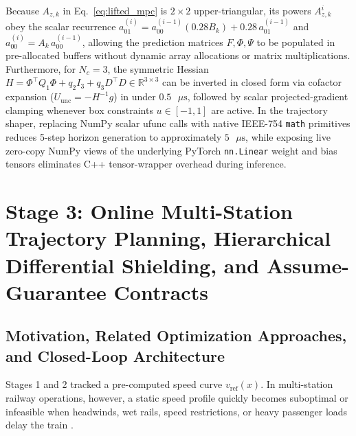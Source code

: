 \documentclass[10pt,a4paper]{article}
\begin{document}
Because $A_{z,k}$ in Eq.~\ref{eq:lifted_mpc} is $2\times 2$ upper-triangular, its powers $A_{z,k}^i$ obey the scalar recurrence $a_{01}^{(i)} = a_{00}^{(i-1)}(0.28 B_k) + 0.28\,a_{01}^{(i-1)}$ and $a_{00}^{(i)} = A_k\,a_{00}^{(i-1)}$, allowing the prediction matrices $F, \Phi, \Psi$ to be populated in pre-allocated buffers without dynamic array allocations or matrix multiplications. Furthermore, for $N_c = 3$, the symmetric Hessian $H = \Phi^\top Q_1 \Phi + q_2 I_3 + q_3 D^\top D \in \mathbb{R}^{3\times 3}$ can be inverted in closed form via cofactor expansion ($U_{\text{unc}} = -H^{-1}g$) in under $0.5\text{ }\mu\text{s}$, followed by scalar projected-gradient clamping whenever box constraints $u \in [-1, 1]$ are active. In the trajectory shaper, replacing NumPy scalar ufunc calls with native IEEE-754 \texttt{math} primitives reduces 5-step horizon generation to approximately $5\text{ }\mu\text{s}$, while exposing live zero-copy NumPy views of the underlying PyTorch \texttt{nn.Linear} weight and bias tensors eliminates C++ tensor-wrapper overhead during inference.

\section{Stage 3: Online Multi-Station Trajectory Planning, Hierarchical Differential Shielding, and Assume-Guarantee Contracts}

\subsection{Motivation, Related Optimization Approaches, and Closed-Loop Architecture}

Stages 1 and 2 tracked a pre-computed speed curve $v_{\text{ref}}(x)$. In multi-station railway operations, however, a static speed profile quickly becomes suboptimal or infeasible when headwinds, wet rails, speed restrictions, or heavy passenger loads delay the train \cite{zhong2022,xiao2023}.
\end{document}
